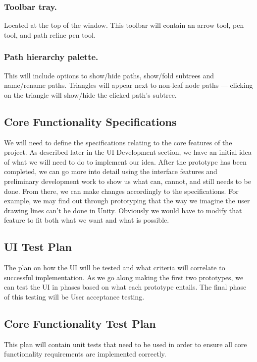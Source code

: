 \documentclass[12pt]{article}
\begin{document}
\subsubsection{Toolbar tray.} Located at the top of the window. This toolbar will contain an arrow tool, pen tool, and path refine pen tool.

\subsubsection{Path hierarchy palette.} This will include options to show/hide paths, show/fold subtrees and name/rename paths. Triangles will appear next to non-leaf node paths --- clicking on the triangle will show/hide the clicked path’s subtree.

\subsection{Core Functionality Specifications}
We will need to define the specifications relating to the core features of the project. As described later in the UI Development section, we have an initial idea of what we will need to do to implement our idea. After the prototype has been completed, we can go more into detail using the interface features and preliminary development work to show us what can, cannot, and still needs to be done. From there, we can make changes accordingly to the specifications. For example, we may find out through prototyping that the way we imagine the user drawing lines can't be done in Unity. Obviously we would have to modify that feature to fit both what we want and what is possible.

\subsection{UI Test Plan}
The plan on how the UI will be tested and what criteria will correlate to successful implementation. As we go along making the first two prototypes, we can test the UI in phases based on what each prototype entails. The final phase of this testing will be User acceptance testing.

\subsection{Core Functionality Test Plan}
This plan will contain unit tests that need to be used in order to ensure all core functionality requirements are implemented correctly.
\end{document}
